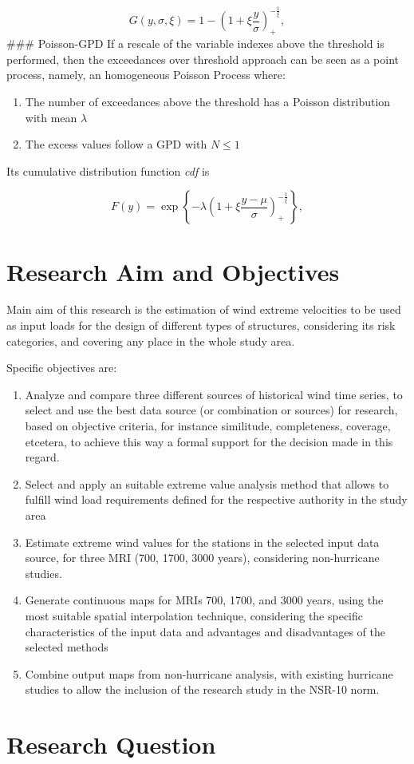 \documentclass[12pt,oneside]{reedthesis}
\providecommand{\tightlist}{%
  \setlength{\itemsep}{0pt}\setlength{\parskip}{0pt}}
\begin{document}
\[
G(y,\sigma, \xi) = 1-\left(1+\xi\frac{y}{\sigma}\right)_+^{-\frac{1}{\xi}},
\]
\#\#\# Poisson-GPD
If a rescale of the variable indexes above the threshold is performed, then the exceedances over threshold approach can be seen as a point process, namely, an homogeneous Poisson Process where:
\begin{enumerate}
\def\labelenumi{\arabic{enumi}.}
\tightlist
\item
  The number of exceedances above the threshold has a Poisson distribution with mean \(\lambda\)
\item
  The excess values follow a GPD with \(N\leq1\)
\end{enumerate}
Its cumulative distribution function \emph{cdf} is

\[
F(y) = \exp\left\{-\lambda\left(1+\xi\frac{y-\mu}{\sigma}\right)_+^{-\frac{1}{\xi}}\right\},
\]

\hypertarget{research-aim-and-objectives}{%
\section{Research Aim and Objectives}\label{research-aim-and-objectives}}

Main aim of this research is the estimation of wind extreme velocities to be used as input loads for the design of different types of structures, considering its risk categories, and covering any place in the whole study area.

Specific objectives are:
\begin{enumerate}
\def\labelenumi{\arabic{enumi}.}
\item
  Analyze and compare three different sources of historical wind time series, to select and use the best data source (or combination or sources) for research, based on objective criteria, for instance similitude, completeness, coverage, etcetera, to achieve this way a formal support for the decision made in this regard.
\item
  Select and apply an suitable extreme value analysis method that allows to fulfill wind load requirements defined for the respective authority in the study area
\item
  Estimate extreme wind values for the stations in the selected input data source, for three MRI (700, 1700, 3000 years), considering non-hurricane studies.
\item
  Generate continuous maps for MRIs 700, 1700, and 3000 years, using the most suitable spatial interpolation technique, considering the specific characteristics of the input data and advantages and disadvantages of the selected methods
\item
  Combine output maps from non-hurricane analysis, with existing hurricane studies to allow the inclusion of the research study in the NSR-10 norm.
\end{enumerate}
\hypertarget{research-question}{%
\section{Research Question}\label{research-question}}
\end{document}
